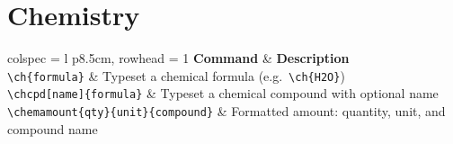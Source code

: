 \section{Chemistry}

\begin{longtblr}[
  caption = {Chemistry commands (via \ctanpackage{chemmacros})},
  label = {tab:cmd-chem},
]{colspec = {l p{8.5cm}}, rowhead = 1}
  \toprule
  \textbf{Command} & \textbf{Description} \\
  \midrule
  \texttt{\textbackslash{}ch\{formula\}} & Typeset a chemical formula (e.g.\
    \texttt{\textbackslash ch\{H2O\}}) \\
  \texttt{\textbackslash{}chcpd[name]\{formula\}} & Typeset a chemical compound with optional
    name \\
  \texttt{\textbackslash{}chemamount\{qty\}\{unit\}\{compound\}} & Formatted amount: quantity, unit,
    and compound name \\
  \bottomrule
\end{longtblr}
